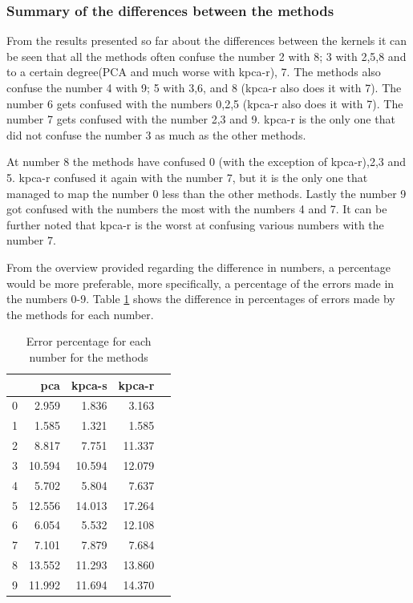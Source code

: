 \subsubsection{Summary of the differences between the methods}
From the results presented so far about the differences between the kernels it can be seen that all the methods often confuse the number 2 with 8; 3 with 2,5,8 and to a certain degree(PCA and much worse with \gls{kpca-r}), 7. The methods also confuse the number 4 with 9; 5 with 3,6, and 8 (\gls{kpca-r} also does it with 7). The number 6 gets confused with the numbers 0,2,5 (\gls{kpca-r} also does it with 7).
The number 7 gets confused with the number 2,3 and 9. \gls{kpca-r} is the only one that did not confuse the number 3 as much as the other methods.

At number 8 the methods have confused 0 (with the exception of \gls{kpca-r}),2,3 and 5. \gls{kpca-r} confused it again with the number 7, but it is the only one that managed to map the number 0 less than the other methods. Lastly the number 9 got confused with the numbers the most with the numbers 4 and 7. It can be further noted that \gls{kpca-r} is the worst at confusing various numbers with the number 7.


From the overview provided regarding the difference in numbers, a percentage would be more preferable, more specifically, a percentage of the errors made in the numbers 0-9. Table \ref{tab:error-percentage-pca-kpca-s-kpca-r} shows the difference in percentages of errors made by the methods for each number.

\begin{table}[htb!]
  \centering
  \caption{Error percentage for each number for the methods}
  \label{tab:error-percentage-pca-kpca-s-kpca-r}
  \begin{tabular}{lrrrr}
  \toprule
   & pca & kpca-s & kpca-r \\
  \midrule
  0 & 2.959 & 1.836 & 3.163 \\
  1 & 1.585 & 1.321 & 1.585  \\
  2 & 8.817 & 7.751 & 11.337  \\
  3 & 10.594 & 10.594 & 12.079  \\
  4 & 5.702 & 5.804 & 7.637  \\
  5 & 12.556 & 14.013 & 17.264  \\
  6 & 6.054 & 5.532 & 12.108  \\
  7 & 7.101 & 7.879 & 7.684  \\
  8 & 13.552 & 11.293 & 13.860  \\
  9 & 11.992 & 11.694 & 14.370  \\
  \bottomrule
  \end{tabular}
  \end{table}

